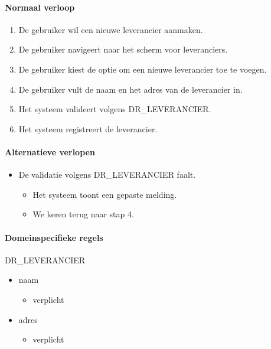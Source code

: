 \paragraph{Normaal verloop}
\begin{enumerate}[nosep]
    \item De gebruiker wil een nieuwe leverancier aanmaken.
    \item De gebruiker navigeert naar het scherm voor leveranciers.
    \item De gebruiker kiest de optie om een nieuwe leverancier toe te voegen.
    \item De gebruiker vult de naam en het adres van de leverancier in.
    \item Het systeem valideert volgens DR\_LEVERANCIER.
    \item Het systeem registreert de leverancier.
\end{enumerate}

\paragraph{Alternatieve verlopen}
\begin{itemize}[nosep]
    \item[5A.] De validatie volgens DR\_LEVERANCIER faalt.
    \begin{itemize}
        \item[5A1.] Het systeem toont een gepaste melding.
        \item[5A2.] We keren terug naar stap 4.
    \end{itemize}
\end{itemize}

\paragraph{Domeinspecifieke regels}
DR\_LEVERANCIER
\begin{itemize}
    \item naam
    \begin{itemize}
        \item verplicht
    \end{itemize}
    \item adres
    \begin{itemize}
        \item verplicht
    \end{itemize}
\end{itemize}

\vspace{1cm}
\pagebreak

